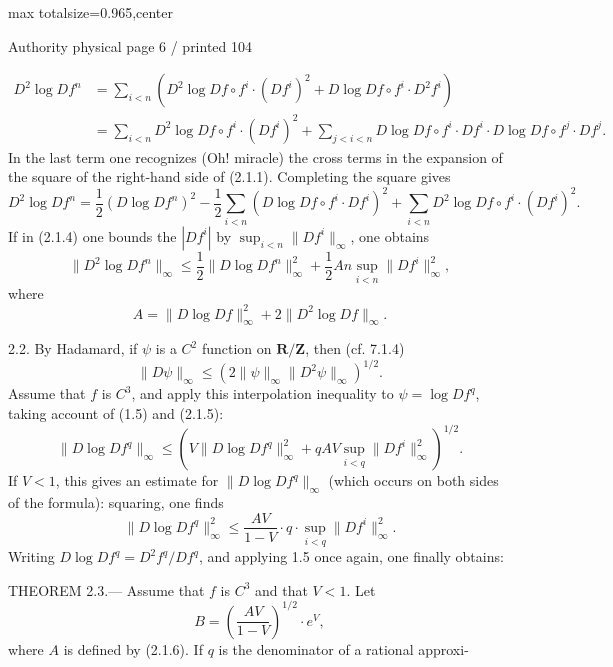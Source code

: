 \documentclass{article}
\begin{document}
\newpage
\noindent\begin{adjustbox}{max totalsize={\textwidth}{0.965\textheight},center}\begin{minipage}{\textwidth}
\noindent\hfill\scriptsize Authority physical page 6 / printed 104\par\normalsize
\[
\tag{2.1.3}
\begin{aligned}
D^2\log Df^n
&=\sum_{i<n}\left(D^2\log Df\circ f^i\cdot(Df^i)^2+D\log Df\circ f^i\cdot D^2f^i\right)\\
&=\sum_{i<n}D^2\log Df\circ f^i\cdot(Df^i)^2
+\sum_{j<i<n}D\log Df\circ f^i\cdot Df^i\cdot D\log Df\circ f^j\cdot Df^j.
\end{aligned}
\]
In the last term one recognizes (Oh! miracle) the cross terms in the expansion of the square of the right-hand side of (2.1.1). Completing the square gives
\[
\tag{2.1.4}
D^2\log Df^n
=\frac12(D\log Df^n)^2
-\frac12\sum_{i<n}(D\log Df\circ f^i\cdot Df^i)^2
+\sum_{i<n}D^2\log Df\circ f^i\cdot(Df^i)^2.
\]
If in (2.1.4) one bounds the \(|Df^i|\) by \(\sup_{i<n}\|Df^i\|_\infty\), one obtains
\[
\tag{2.1.5}
\|D^2\log Df^n\|_\infty
\leq\frac12\|D\log Df^n\|_\infty^2
+\frac12An\sup_{i<n}\|Df^i\|_\infty^2,
\]
where
\[
\tag{2.1.6}
A=\|D\log Df\|_\infty^2+2\|D^2\log Df\|_\infty.
\]

2.2. By Hadamard, if \(\psi\) is a \(C^2\) function on \(\mathbf R/\mathbf Z\), then (cf. 7.1.4)
\[
\tag{2.2.1}
\|D\psi\|_\infty\leq\left(2\|\psi\|_\infty\|D^2\psi\|_\infty\right)^{1/2}.
\]
Assume that \(f\) is \(C^3\), and apply this interpolation inequality to \(\psi=\log Df^q\), taking account of (1.5) and (2.1.5):
\[
\tag{2.2.2}
\|D\log Df^q\|_\infty
\leq\left(V\|D\log Df^q\|_\infty^2
+qAV\sup_{i<q}\|Df^i\|_\infty^2\right)^{1/2}.
\]
If \(V<1\), this gives an estimate for \(\|D\log Df^q\|_\infty\) (which occurs on both sides of the formula): squaring, one finds
\[
\|D\log Df^q\|_\infty^2
\leq\frac{AV}{1-V}\cdot q\cdot\sup_{i<q}\|Df^i\|_\infty^2.
\]
Writing \(D\log Df^q=D^2f^q/Df^q\), and applying 1.5 once again, one finally obtains:

THEOREM 2.3.— Assume that \(f\) is \(C^3\) and that \(V<1\). Let
\[
B=\left(\frac{AV}{1-V}\right)^{1/2}\cdot e^V,
\]
where \(A\) is defined by (2.1.6). If \(q\) is the denominator of a rational approxi-
\end{minipage}\end{adjustbox}
\end{document}
